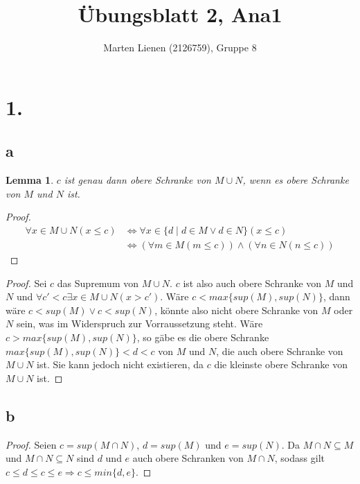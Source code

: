 \documentclass[a4paper,10pt]{article}
\title{Übungsblatt 2, Ana1}
\author{Marten Lienen (2126759), Gruppe 8}
\newtheorem*{lemma}{Lemma}
\begin{document}
\maketitle

\section*{1.}

\subsection*{a}

\begin{lemma}
 $c$ ist genau dann obere Schranke von $M \cup N$, wenn es obere Schranke von $M$ und $N$ ist.
\end{lemma}

\begin{proof}
 \begin{align*}
  \forall x \in M \cup N (x \le c) & \Leftrightarrow \forall x \in \{d \mid d \in M \lor d \in N\} (x \le c)\\
  & \Leftrightarrow (\forall m \in M (m \le c)) \land (\forall n \in N (n \le c))
 \end{align*}
\end{proof}

\begin{proof}
 Sei $c$ das Supremum von $M \cup N$.
 $c$ ist also auch obere Schranke von $M$ und $N$ und $\forall c' < c \exists x \in M \cup N (x > c')$.
 Wäre $c < max \{sup(M), sup(N)\}$, dann wäre $c < sup(M) \lor c < sup(N)$, könnte also nicht obere Schranke von $M$ oder $N$ sein, was im Widerspruch zur Vorraussetzung steht.
 Wäre $c > max \{sup(M), sup(N)\}$, so gäbe es die obere Schranke $max \{sup(M), sup(N)\} < d < c$ von $M$ und $N$, die auch obere Schranke von $M \cup N$ ist.
 Sie kann jedoch nicht existieren, da $c$ die kleinste obere Schranke von $M \cup N$ ist.
\end{proof}

\subsection*{b}

\begin{proof}
 Seien $c = sup(M \cap N)$, $d = sup(M)$ und $e = sup(N)$.
 Da $M \cap N \subseteq M$ und $M \cap N \subseteq N$ sind $d$ und $e$ auch obere Schranken von $M \cap N$, sodass gilt $c \le d \le c \le e \Rightarrow c \le min \{d, e\}$.
\end{proof}
\end{document}
